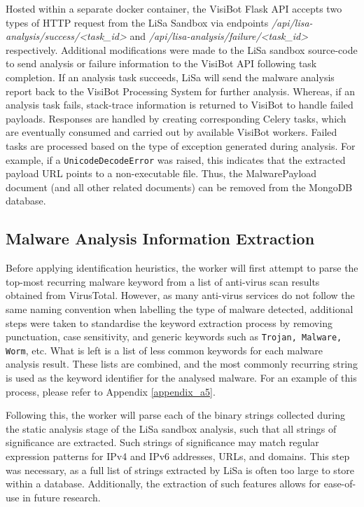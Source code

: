 Hosted within a separate docker container, the VisiBot Flask API accepts two types of HTTP request from the LiSa Sandbox via endpoints \textit{/api/lisa-analysis/success/<task\_id>} and \textit{/api/lisa-analysis/failure/<task\_id>} respectively. Additional modifications were made to the LiSa sandbox source-code to send analysis or failure information to the VisiBot API following task completion. If an analysis task succeeds, LiSa will send the malware analysis report back to the VisiBot Processing System for further analysis. Whereas, if an analysis task fails, stack-trace information is returned to VisiBot to handle failed payloads. Responses are handled by creating corresponding Celery tasks, which are eventually consumed and carried out by available VisiBot workers. Failed tasks are processed based on the type of exception generated during analysis. For example, if a \texttt{UnicodeDecodeError} was raised, this indicates that the extracted payload URL points to a non-executable file. Thus, the MalwarePayload document (and all other related documents) can be removed from the MongoDB database.

\subsection{Malware Analysis Information Extraction}

Before applying identification heuristics, the worker will first attempt to parse the top-most recurring malware keyword from a list of anti-virus scan results obtained from VirusTotal. However, as many anti-virus services do not follow the same naming convention when labelling the type of malware detected, additional steps were taken to standardise the keyword extraction process by removing punctuation, case sensitivity, and generic keywords such as \texttt{Trojan, Malware, Worm}, etc. What is left is a list of less common keywords for each malware analysis result. These lists are combined, and the most commonly recurring string is used as the keyword identifier for the analysed malware. For an example of this process, please refer to Appendix \ref{appendix_a5}.

Following this, the worker will parse each of the binary strings collected during the static analysis stage of the LiSa sandbox analysis, such that all strings of significance are extracted. Such strings of significance may match regular expression patterns for IPv4 and IPv6 addresses, URLs, and domains. This step was necessary, as a full list of strings extracted by LiSa is often too large to store within a database. Additionally, the extraction of such features allows for ease-of-use in future research.

